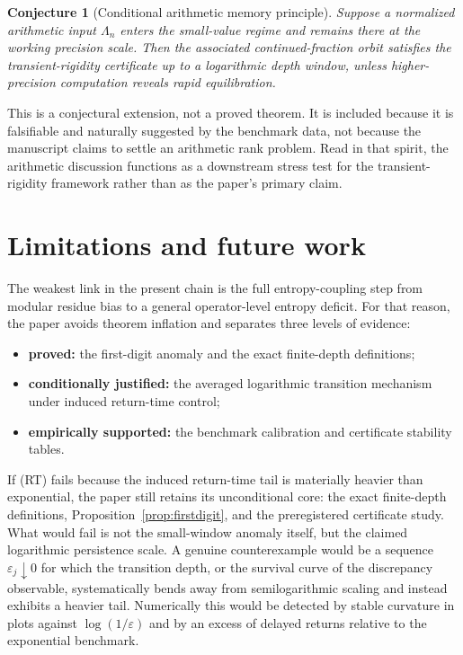 \documentclass[11pt]{article}
\newtheorem{conjecture}[definition]{Conjecture}
\begin{document}
\begin{conjecture}[Conditional arithmetic memory principle]
Suppose a normalized arithmetic input $\Lambda_n$ enters the small-value regime and remains there at the working precision scale. Then the associated continued-fraction orbit satisfies the transient-rigidity certificate up to a logarithmic depth window, unless higher-precision computation reveals rapid equilibration.
\end{conjecture}

This is a conjectural extension, not a proved theorem. It is included because it is falsifiable and naturally suggested by the benchmark data, not because the manuscript claims to settle an arithmetic rank problem. Read in that spirit, the arithmetic discussion functions as a downstream stress test for the transient-rigidity framework rather than as the paper's primary claim.

\section{Limitations and future work}

The weakest link in the present chain is the full entropy-coupling step from modular residue bias to a general operator-level entropy deficit. For that reason, the paper avoids theorem inflation and separates three levels of evidence:
\begin{itemize}
    \item \textbf{proved:} the first-digit anomaly and the exact finite-depth definitions;
    \item \textbf{conditionally justified:} the averaged logarithmic transition mechanism under induced return-time control;
    \item \textbf{empirically supported:} the benchmark calibration and certificate stability tables.
\end{itemize}

If \textnormal{(RT)} fails because the induced return-time tail is materially heavier than exponential, the paper still retains its unconditional core: the exact finite-depth definitions, Proposition~\ref{prop:firstdigit}, and the preregistered certificate study. What would fail is not the small-window anomaly itself, but the claimed logarithmic persistence scale. A genuine counterexample would be a sequence $\varepsilon_j\downarrow 0$ for which the transition depth, or the survival curve of the discrepancy observable, systematically bends away from semilogarithmic scaling and instead exhibits a heavier tail. Numerically this would be detected by stable curvature in plots against $\log(1/\varepsilon)$ and by an excess of delayed returns relative to the exponential benchmark.
\end{document}
